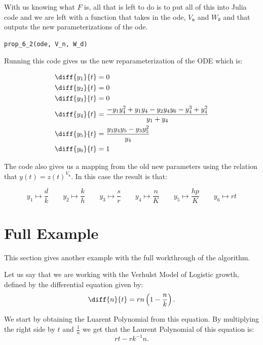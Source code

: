 \documentclass[oneside, a4paper, onecolumn, 11pt]{article}
\begin{document}
With us knowing what \(F\) is, all that is left to do is to put all of this into Julia code and we are left with a function that takes in the ode, \(V_{\mathfrak{n}}\) and \(W_{\mathfrak{d}}\) and that outputs the new parameterizations of the ode.
\begin{lstlisting}
prop_6_2(ode, V_n, W_d)
\end{lstlisting}

Running this code gives us the new reparameterization of the ODE which is:

\begin{align*}
    \diff{y_1}{t} & = 0                                                                    \\
    \diff{y_2}{t} & = 0                                                                    \\
    \diff{y_3}{t} & = 0                                                                    \\
    \diff{y_4}{t} & = \frac{-y_1 y_4^2 + y_1 y_4 - y_2 y_4 y_6 - y_4^3 + y_4^2}{y_1 + y_4} \\
    \diff{y_5}{t} & = \frac{y_3 y_4 y_5 - y_3 y_5^2}{y_4}                                  \\
    \diff{y_6}{t} & = 1
\end{align*}

The code also gives us a mapping from the old new parameters using the relation that \(y(t) = z(t)^{V_\mathfrak{n}}\). In this case the result is that:

\[
    y_1 \mapsto \frac{d}{k} \qquad
    y_2 \mapsto \frac{k}{h} \qquad
    y_3 \mapsto \frac{s}{r} \qquad
    y_4 \mapsto \frac{n}{K} \qquad
    y_5 \mapsto \frac{hp}{K} \qquad
    y_6 \mapsto r t
\]

\section{Full Example}

This section gives another example with the full workthrough of the algorithm.

Let us say that we are working with the Verhulst Model of Logistic growth, defined by the differential equation given by:
\[
    \diff{n}{t} = rn \left( 1 - \frac{n}{k} \right).
\]

We start by obtaining the Luarent Polynomial from this equation. By multiplying the right side by \(t\) and \(\frac{1}{n}\) we get that the Laurent Polynomial of this equation is:
\[
    r t - r k^{-1} n.
\]
\end{document}
